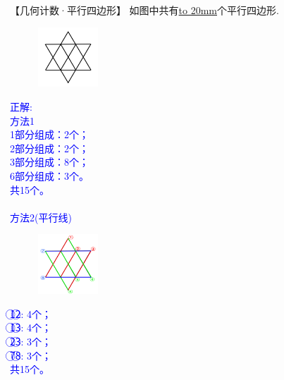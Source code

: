\item {
    【几何计数·平行四边形】
    如图中共有\underline{\hbox to 20mm{}}个平行四边形.
    \begin{figure}[H] 
        \centering
        \includegraphics[width=0.2\textwidth]{./pics/Chapter_4/2017_1.png}
    \end{figure}
    \ifshowSolution 
        \fangsong{}\textcolor{blue}{
            正解: \\
            方法1\\
            1部分组成：2个；\\
            2部分组成：2个；\\
            3部分组成：8个；\\
            6部分组成：3个。\\
            共15个。\\\\
            方法2(平行线)\\
            \begin{figure}[H] 
                \centering
                \includegraphics[width=0.2\textwidth]{./pics/Chapter_4/seikai_2017_1.png}
            \end{figure}
            \textcircled{1}\textcircled{2}: 4个；\\
            \textcircled{1}\textcircled{3}: 4个；\\
            \textcircled{2}\textcircled{3}: 3个；\\
            \textcircled{7}\textcircled{8}: 3个；\\
            共15个。
        }
    \else
        \vspace{1cm}
    \fi
}

